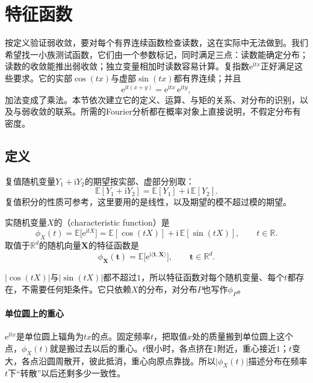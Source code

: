 \section{特征函数}
\label{sec:weak-cf}

按定义验证弱收敛，要对每个有界连续函数检查读数，这在实际中无法做到。我们希望找一小族测试函数，它们由一个参数标记，同时满足三点：读数能确定分布；读数的收敛能推出弱收敛；独立变量相加时读数容易计算。复指数$\mathrm{e}^{\mathrm{i}tx}$正好满足这些要求。它的实部$\cos(tx)$与虚部$\sin(tx)$都有界连续；并且
\[
 \mathrm{e}^{\mathrm{i}t(x+y)}=\mathrm{e}^{\mathrm{i}tx}\,\mathrm{e}^{\mathrm{i}ty} ,
\]
加法变成了乘法。本节依次建立它的定义、运算、与矩的关系、对分布的识别，以及与弱收敛的联系。所需的Fourier分析都在概率对象上直接说明，不假定分布有密度。

\subsection{定义}
\label{sec:weak-cf-definition}

复值随机变量$Y_1+\mathrm{i}Y_2$的期望按实部、虚部分别取：
\[
 \mathbb{E}[Y_1+\mathrm{i}Y_2]=\mathbb{E}[Y_1]+\mathrm{i}\,\mathbb{E}[Y_2] .
\]
复值积分的性质可参考，这里要用的是线性，以及期望的模不超过模的期望。

\begin{definition}[特征函数]
\label{def:weak-cf}
实随机变量$X$的（characteristic function）是
\begin{equation}
 \phi_X(t)=\mathbb{E}\bigl[\mathrm{e}^{\mathrm{i}tX}\bigr]=\mathbb{E}[\cos(tX)]+\mathrm{i}\,\mathbb{E}[\sin(tX)],\qquad t\in\mathbb{R} .
 \label{eq:weak-cf}
\end{equation}
取值于$\mathbb{R}^{d}$的随机向量$\bm{X}$的特征函数是
\begin{equation}
 \phi_{\bm{X}}(\bm{t})=\mathbb{E}\bigl[\mathrm{e}^{\mathrm{i}\langle\bm{t},\bm{X}\rangle}\bigr],\qquad \bm{t}\in\mathbb{R}^{d} .
 \label{eq:weak-cf-vector}
\end{equation}
\end{definition}

$\lvert\cos(tX)\rvert$与$\lvert\sin(tX)\rvert$都不超过$1$，所以特征函数对每个随机变量、每个$t$都存在，不需要任何矩条件。它只依赖$X$的分布，对分布$P$也写作$\phi_P$。

\paragraph{单位圆上的重心}
$\mathrm{e}^{\mathrm{i}tx}$是单位圆上辐角为$tx$的点。固定频率$t$，把取值$x$处的质量搬到单位圆上这个点，$\phi_X(t)$就是搬过去以后的重心。$t$很小时，各点挤在$1$附近，重心接近$1$；$t$变大，各点沿圆周散开，彼此抵消，重心向原点靠拢。所以$\lvert\phi_X(t)\rvert$描述分布在频率$t$下“转散”以后还剩多少一致性。

